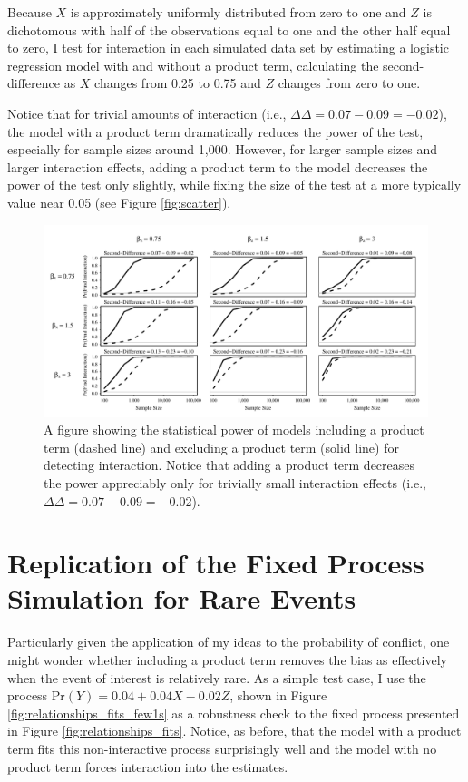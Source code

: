 \documentclass[12pt]{article}
\begin{document}
\begin{appendix}
Because $X$ is approximately uniformly distributed from zero to one and $Z$ is dichotomous with half of the observations equal to one and the other half equal to zero, I test for interaction in each simulated data set by estimating a logistic regression model with and without a product term, calculating the second-difference as $X$ changes from 0.25 to 0.75 and $Z$ changes from zero to one. 

Notice that for trivial amounts of interaction (i.e., $\Delta\Delta = 0.07-0.09 = -0.02$), the model with a product term dramatically reduces the power of the test, especially for sample sizes around 1,000. However, for larger sample sizes and larger interaction effects, adding a product term to the model decreases the power of the test only slightly, while fixing the size of the test at a more typically value near 0.05 (see Figure \ref{fig:scatter}).

\begin{figure}[H]
\begin{center}
\includegraphics[scale = .8]{fig/pwr.pdf}
\end{center}\caption{A figure showing the statistical power of models including a product term (dashed line) and excluding a product term (solid line) for detecting interaction. Notice that adding a product term decreases the power appreciably only for trivially small interaction effects (i.e., $\Delta\Delta = 0.07-0.09 = -0.02$).}\label{fig:pwr}
\end{figure}

\section*{Replication of the Fixed Process Simulation for Rare Events}

Particularly given the application of my ideas to the probability of conflict, one might wonder whether including a product term removes the bias as effectively when the event of interest is relatively rare. As a simple test case, I use the process $\text{Pr}(Y) = 0.04 + 0.04X - 0.02Z$, shown in Figure \ref{fig:relationships_fits_few1s} as a robustness check to the fixed process presented in Figure \ref{fig:relationships_fits}. Notice, as before, that the model with a product term fits this non-interactive process surprisingly well and the model with no product term forces interaction into the estimates.


\end{appendix}
\end{document}
